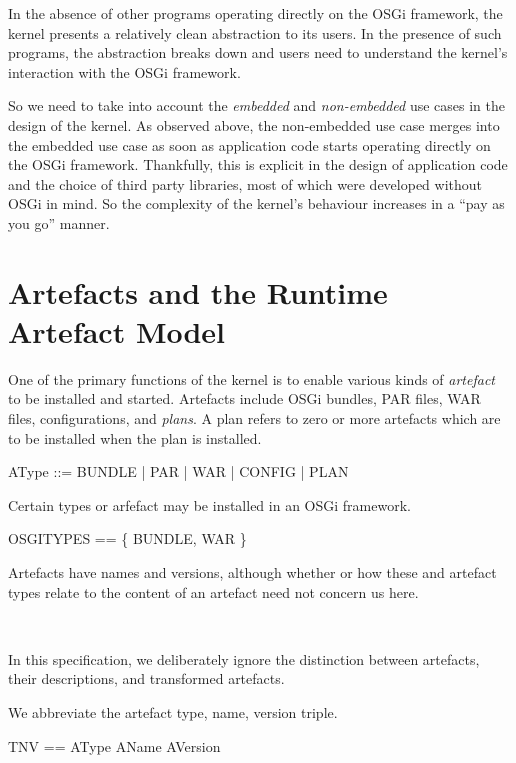 \documentclass[a4paper,12pt]{article}
\begin{document}
In the absence of other programs operating directly on the OSGi framework, the kernel
presents a relatively clean abstraction to its users.
In the presence of such programs, the abstraction breaks down and users need to understand
the kernel's interaction with the OSGi framework.

So we need to take into account the \textit{embedded} and \textit{non-embedded} use cases in the design of the kernel.
As observed above, the non-embedded use case merges into the embedded use case as soon
as application code starts operating directly on the OSGi framework.
Thankfully, this is explicit in the design of application code and the choice of third party libraries, most of which were developed without OSGi in mind.
So the complexity of the kernel's behaviour increases in a ``pay as you go'' manner.

\clearpage
\section{Artefacts and the Runtime Artefact Model}

One of the primary functions of the kernel is to enable various kinds of \textit{artefact} to be installed
and started.
Artefacts include OSGi bundles, PAR files, WAR files, configurations, and \textit{plans}.
A plan refers to zero or more artefacts which are to be installed when the plan is
installed.
\begin{zed}
AType ::= BUNDLE | PAR | WAR | CONFIG | PLAN \\
\end{zed}

Certain types or arfefact may be installed in an OSGi framework.
\begin{zed}
OSGITYPES == \{ BUNDLE, WAR \} \\
\end{zed}

Artefacts have names and versions, although whether or how these and artefact types relate to the 
content of an artefact need not concern us here.
\begin{zed}
 \\
\end{zed}

In this specification, we deliberately ignore the distinction between artefacts, their descriptions, and
transformed artefacts.

We abbreviate the artefact type, name, version triple.
\begin{zed}
TNV == AType \cross AName \cross AVersion
\end{zed}
\end{document}
